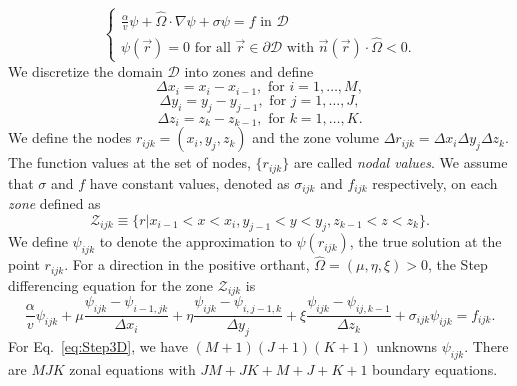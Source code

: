 \begin{equation}
\begin{cases}
	\frac{\alpha}{v} \psi + \hat{\Omega} \cdot \nabla \psi + \sigma \psi = f \text{ in } \mathcal{D} \\
	\psi(\vec{r}) = 0 \text{ for all } \vec{r} \in \partial \mathcal{D} \text { with } \vec{n}(\vec{r}) \cdot \hat{\Omega} < 0.
\end{cases}
\label{eq:ContG}
\end{equation}
We discretize the domain $\mathcal{D}$ into zones and define
\begin{equation}
	\Delta x_{i} = x_{i} - x_{i-1}, \text{ for } i = 1, \dots, M,
\end{equation}
\begin{equation}
	\Delta y_{i} = y_{j} - y_{j-1}, \text{ for } j = 1, \dots, J,
\end{equation}
\begin{equation}
	\Delta z_{i} = z_{k} - z_{k-1}, \text{ for } k = 1, \dots, K.
\end{equation}
We define the nodes $r_{ijk} = (x_{i}, y_{j}, z_{k})$ and the zone volume $\Delta r_{ijk} = \Delta x_{i} \Delta y_{j} \Delta z_{k}$. The function values at the set of nodes, $\{r_{ijk}\}$ are called \textit{nodal values}. We assume that $\sigma$ and $f$ have constant values, denoted as $\sigma_{ijk}$ and $f_{ijk}$ respectively, on each \textit{zone} defined as
\begin{equation}
	\mathcal{Z}_{ijk} \equiv \{ r \vert x_{i-1} < x < x_{i}, y_{j-1} < y < y_{j}, z_{k-1} < z < z_{k} \}.
\end{equation}
We define $\psi_{ijk}$ to denote the approximation to $\psi(r_{ijk})$, the true solution at the point $r_{ijk}$. For a direction in the positive orthant, $\hat{\Omega} = (\mu, \eta, \xi) > 0$, the Step differencing equation for the zone $\mathcal{Z}_{ijk}$ is
\begin{equation}
	\frac{\alpha}{v} \psi_{ijk} + \mu \frac{\psi_{ijk} - \psi_{i-1,jk}}{\Delta x_{i}} + \eta \frac{\psi_{ijk} - \psi_{i,j-1,k}}{\Delta y_{j}} + \xi \frac{\psi_{ijk} - \psi_{ij,k-1}}{\Delta z_{k}} + \sigma_{ijk} \psi_{ijk} = f_{ijk}.
	\label{eq:Step3D}
\end{equation}
For Eq.~\ref{eq:Step3D}, we have $(M+1)(J+1)(K+1)$ unknowns $\psi_{ijk}$. There are $MJK$ zonal equations with $JM + JK + M + J + K + 1$ boundary equations.

